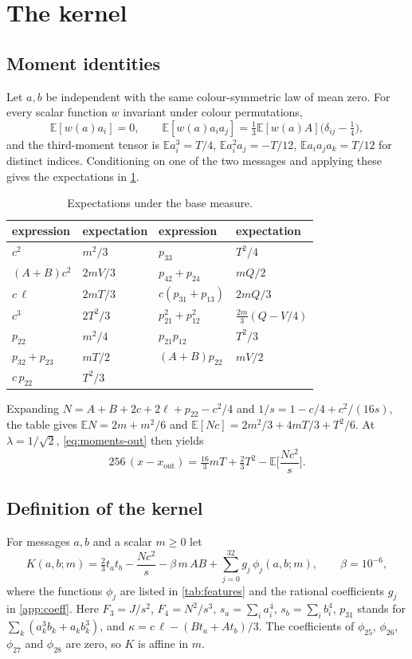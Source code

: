 \documentclass[11pt]{amsart}
\theoremstyle{definition}
\theoremstyle{remark}
\newcommand{\E}{\mathbb{E}}
\begin{document}
\section{The kernel}\label{sec:kernel}

\subsection{Moment identities}
Let $a,b$ be independent with the same colour-symmetric law of mean zero. For every scalar function
$w$ invariant under colour permutations,
\begin{equation}\label{eq:weighted}
\E[w(a)a_i]=0,\qquad \E[w(a)a_ia_j]=\tfrac13\E[w(a)A]\big(\delta_{ij}-\tfrac14\big),
\end{equation}
and the third-moment tensor is $\E a_i^3=T/4$, $\E a_i^2a_j=-T/12$, $\E a_ia_ja_k=T/12$ for distinct
indices. Conditioning on one of the two messages and applying these gives the expectations in
\cref{tab:moments}.

\begin{table}[h]
\centering
\begin{tabular}{ll@{\qquad}ll}
\toprule
expression & expectation & expression & expectation\\
\midrule
$c^2$ & $m^2/3$ & $p_{33}$ & $T^2/4$\\
$(A+B)c^2$ & $2mV/3$ & $p_{42}+p_{24}$ & $mQ/2$\\
$c\,\ell$ & $2mT/3$ & $c(p_{31}+p_{13})$ & $2mQ/3$\\
$c^3$ & $2T^2/3$ & $p_{21}^2+p_{12}^2$ & $\tfrac{2m}3(Q-V/4)$\\
$p_{22}$ & $m^2/4$ & $p_{21}p_{12}$ & $T^2/3$\\
$p_{32}+p_{23}$ & $mT/2$ & $(A+B)p_{22}$ & $mV/2$\\
$c\,p_{22}$ & $T^2/3$ & & \\
\bottomrule
\end{tabular}
\caption{Expectations under the base measure.}\label{tab:moments}
\end{table}

Expanding $N=A+B+2c+2\ell+p_{22}-c^2/4$ and $1/s=1-c/4+c^2/(16s)$, the table gives
$\E N=2m+m^2/6$ and $\E[Nc]=2m^2/3+4mT/3+T^2/6$. At $\lambda=1/\sqrt2$, \eqref{eq:moments-out}
then yields
\begin{equation}\label{eq:drift}
256\,(x-x_{\mathrm{out}})=\tfrac{16}3mT+\tfrac23T^2-\E\Big[\frac{Nc^2}{s}\Big].
\end{equation}

\subsection{Definition of the kernel}
For messages $a,b$ and a scalar $m\ge0$ let
\[
K(a,b;m)=\tfrac23t_at_b-\frac{Nc^2}{s}-\beta\,m\,AB+\sum_{j=0}^{32}g_j\,\phi_j(a,b;m),
\qquad \beta=10^{-6},
\]
where the functions $\phi_j$ are listed in \cref{tab:features} and the rational coefficients $g_j$ in
\cref{app:coeff}. Here $F_3=J/s^2$, $F_4=N^2/s^3$, $s_a=\sum_ia_i^4$, $s_b=\sum_ib_i^4$, $p_{31}$ stands
for $\sum_k(a_k^3b_k+a_kb_k^3)$, and $\kappa=c\,\ell-(Bt_a+At_b)/3$. The coefficients of $\phi_{25}$,
$\phi_{26}$, $\phi_{27}$ and $\phi_{28}$ are zero, so $K$ is affine in $m$.
\end{document}
